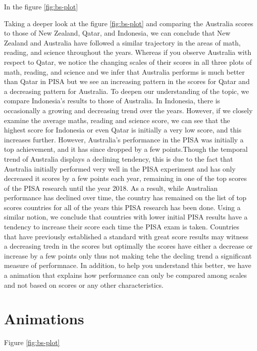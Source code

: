 In the figure \ref{fig:bs-plot}

Taking a deeper look at the figure \ref{fig:bs-plot} and comparing the
Australia scores to those of New Zealand, Qatar, and Indonesia, we can
conclude that New Zealand and Australia have followed a similar
trajectory in the areas of math, reading, and science throughout the
years. Whereas if you observe Australia with respect to Qatar, we notice
the changing scales of their scores in all three plots of math, reading,
and science and we infer that Australia performs is much better than
Qatar in PISA but we see an increasing pattern in the scores for Qatar
and a decreasing pattern for Australia. To deepen our understanding of
the topic, we compare Indonesia's results to those of Australia. In
Indonesia, there is occasionally a growing and decreasing trend over the
years. However, if we closely examine the average maths, reading and
science score, we can see that the highest score for Indonesia or even
Qatar is initially a very low score, and this increases further.
However, Australia's performance in the PISA was initially a top
achievement, and it has since dropped by a few points.Though the
temporal trend of Australia displays a declining tendency, this is due
to the fact that Australia initially performed very well in the PISA
experiment and has only decreased it scores by a few points each year,
remaining in one of the top scores of the PISA research until the year
2018. As a result, while Australian performance has declined over time,
the country has remained on the list of top scores countries for all of
the years this PISA research has been done. Using a similar notion, we
conclude that countries with lower initial PISA results have a tendency
to increase their score each time the PISA exam is taken. Countries that
have previously established a standard with great score results may
witness a decreasing tredn in the scores but optimally the scores have
either a decrease or increase by a few points only thus not making tehe
the decling trend a significant measure of performnace. In addition, to
help you understand this better, we have a animation that explains how
performance can only be compared among scales and not based on scores or
any other characteristics.

\hypertarget{animations}{%
\section{Animations}\label{animations}}

Figure \ref{fig:bs-plot}

